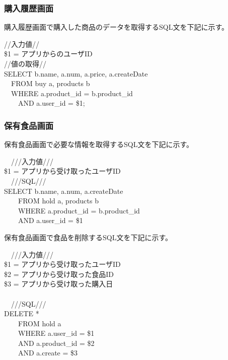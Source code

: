 \documentclass[a4j]{jarticle}
\begin{document}
\subsubsection{購入履歴画面}
購入履歴画面で購入した商品のデータを取得するSQL文を下記に示す。
\begin{screen}
  //入力値// \\
  \$1 = アプリからのユーザID \\

  //値の取得// \\
  SELECT b.name, a.num, a.price, a.createDate \\
  　FROM buy a, products b \\
  　WHERE a.product\_id = b.product\_id \\
  　　AND a.user\_id = \$1;
\end{screen}


\subsubsection{保有食品画面}
保有食品画面で必要な情報を取得するSQL文を下記に示す。
\begin{screen}
  　///入力値///\\
  \$1 = アプリから受け取ったユーザID
  \\
  　///SQL///\\
  SELECT b.name, a.num, a.createDate\\
  　　FROM hold a, products b\\
  　　WHERE a.product\_id = b.product\_id\\
  　　AND a.user\_id = \$1
\end{screen}

保有食品画面で食品を削除するSQL文を下記に示す。
\begin{screen}
  　///入力値///\\
  \$1 = アプリから受け取ったユーザID\\
  \$2 = アプリから受け取った食品ID\\
  \$3 = アプリから受け取った購入日\\
  \\
  　///SQL///\\
  DELETE *\\
  　　FROM hold a\\
  　　WHERE a.user\_id = \$1\\
  　　AND a.product\_id = \$2\\
  　　AND a.create = \$3
\end{screen}
\end{document}
